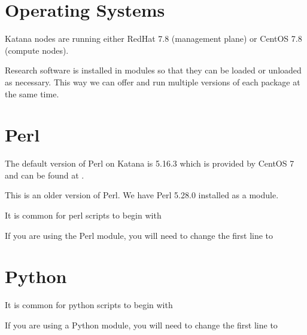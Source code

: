 \documentclass[letterpaper,10pt,english]{sphinxmanual}
\begin{document}
\section{Operating Systems}
\label{\detokenize{software/operating_systems:operating-systems}}\label{\detokenize{software/operating_systems::doc}}
Katana nodes are running either RedHat 7.8 (management plane) or CentOS 7.8 (compute nodes).

Research software is installed in modules so that they can be loaded or unloaded as necessary. This way we can offer and run multiple versions of each package at the same time.


\section{Perl}
\label{\detokenize{software/perl:perl}}\label{\detokenize{software/perl::doc}}
The default version of Perl on Katana is 5.16.3 which is provided by CentOS 7 and can be found at .

This is an older version of Perl. We have Perl 5.28.0 installed as a module.

It is common for perl scripts to begin with

\begin{sphinxVerbatim}[commandchars=\\\{\}]
\end{sphinxVerbatim}

If you are using the Perl module, you will need to change the first line to

\begin{sphinxVerbatim}[commandchars=\\\{\}]
\end{sphinxVerbatim}


\section{Python}
\label{\detokenize{software/python:python}}\label{\detokenize{software/python::doc}}
It is common for python scripts to begin with

\begin{sphinxVerbatim}[commandchars=\\\{\}]
\end{sphinxVerbatim}

If you are using a Python module, you will need to change the first line to
\end{document}
